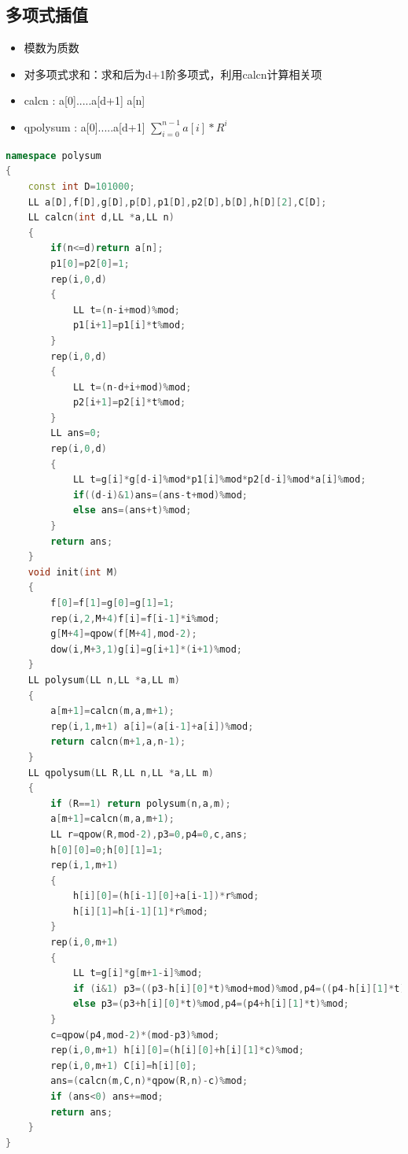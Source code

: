 \documentclass[UTF8,a4paper,titlepage]{ctexart}
\begin{document}
\subsection{多项式插值}
\begin{itemize}
	\item 模数为质数
	\item 对多项式求和：求和后为d+1阶多项式，利用calcn计算相关项
	\item calcn    : a[0].....a[d+1] a[n]
	\item qpolysum : a[0].....a[d+1] $\sum_{i=0}^{n-1} a[i]*R^i$
\end{itemize}
\begin{lstlisting}[language=C++] 
namespace polysum
{
    const int D=101000;
    LL a[D],f[D],g[D],p[D],p1[D],p2[D],b[D],h[D][2],C[D];
    LL calcn(int d,LL *a,LL n)
    {
        if(n<=d)return a[n];
        p1[0]=p2[0]=1;
        rep(i,0,d)
        {
            LL t=(n-i+mod)%mod;
            p1[i+1]=p1[i]*t%mod;
        }
        rep(i,0,d)
        {
            LL t=(n-d+i+mod)%mod;
            p2[i+1]=p2[i]*t%mod;
        }
        LL ans=0;
        rep(i,0,d)
        {
            LL t=g[i]*g[d-i]%mod*p1[i]%mod*p2[d-i]%mod*a[i]%mod;
            if((d-i)&1)ans=(ans-t+mod)%mod;
            else ans=(ans+t)%mod;
        }
        return ans;
    }
    void init(int M)
    {
        f[0]=f[1]=g[0]=g[1]=1;
        rep(i,2,M+4)f[i]=f[i-1]*i%mod;
        g[M+4]=qpow(f[M+4],mod-2);
        dow(i,M+3,1)g[i]=g[i+1]*(i+1)%mod;
    }
    LL polysum(LL n,LL *a,LL m)
    {
        a[m+1]=calcn(m,a,m+1);
        rep(i,1,m+1) a[i]=(a[i-1]+a[i])%mod;
        return calcn(m+1,a,n-1);
    }
    LL qpolysum(LL R,LL n,LL *a,LL m)
    {
        if (R==1) return polysum(n,a,m);
        a[m+1]=calcn(m,a,m+1);
        LL r=qpow(R,mod-2),p3=0,p4=0,c,ans;
        h[0][0]=0;h[0][1]=1;
        rep(i,1,m+1)
        {
            h[i][0]=(h[i-1][0]+a[i-1])*r%mod;
            h[i][1]=h[i-1][1]*r%mod;
        }
        rep(i,0,m+1)
        {
            LL t=g[i]*g[m+1-i]%mod;
            if (i&1) p3=((p3-h[i][0]*t)%mod+mod)%mod,p4=((p4-h[i][1]*t)%mod+mod)%mod;
            else p3=(p3+h[i][0]*t)%mod,p4=(p4+h[i][1]*t)%mod;
        }
        c=qpow(p4,mod-2)*(mod-p3)%mod;
        rep(i,0,m+1) h[i][0]=(h[i][0]+h[i][1]*c)%mod;
        rep(i,0,m+1) C[i]=h[i][0];
        ans=(calcn(m,C,n)*qpow(R,n)-c)%mod;
        if (ans<0) ans+=mod;
        return ans;
    }
}
\end{lstlisting}
\end{document}
